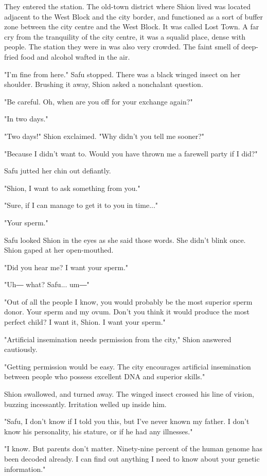 They entered the station. The old-town district where Shion lived was
located adjacent to the West Block and the city border, and functioned
as a sort of buffer zone between the city centre and the West Block. It
was called Lost Town. A far cry from the tranquility of the city centre,
it was a squalid place, dense with people. The station they were in was
also very crowded. The faint smell of deep-fried food and alcohol wafted
in the air.

"I'm fine from here." Safu stopped. There was a black winged insect on
her shoulder. Brushing it away, Shion asked a nonchalant question.

"Be careful. Oh, when are you off for your exchange again?"

"In two days."

"Two days!" Shion exclaimed. "Why didn't you tell me sooner?"

"Because I didn't want to. Would you have thrown me a farewell party if
I did?"

Safu jutted her chin out defiantly.

"Shion, I want to ask something from you."

"Sure, if I can manage to get it to you in time..."

"Your sperm."

Safu looked Shion in the eyes as she said those words. She didn't blink
once. Shion gaped at her open-mouthed.

"Did you hear me? I want your sperm."

"Uh― what? Safu... um―"

"Out of all the people I know, you would probably be the most superior
sperm donor. Your sperm and my ovum. Don't you think it would produce
the most perfect child? I want it, Shion. I want your sperm."

"Artificial insemination needs permission from the city," Shion answered
cautiously.

"Getting permission would be easy. The city encourages artificial
insemination between people who possess excellent DNA and superior
skills."

Shion swallowed, and turned away. The winged insect crossed his line of
vision, buzzing incessantly. Irritation welled up inside him.

"Safu, I don't know if I told you this, but I've never known my father.
I don't know his personality, his stature, or if he had any illnesses."

"I know. But parents don't matter. Ninety-nine percent of the human
genome has been decoded already. I can find out anything I need to know
about your genetic information."

